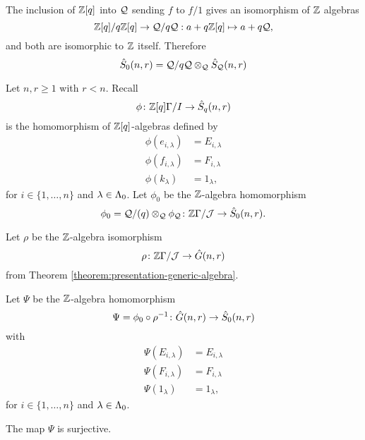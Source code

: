 \documentclass[a4paper, 11pt]{report}
\begin{document}
The inclusion of $\mathbb{Z}[q]$ into $\mathcal{Q}$ sending $f$ to $f/1$ gives an isomorphism of $\mathbb{Z}$ algebras
\begin{equation*}
\mathbb{Z}[q]/{q\mathbb{Z}[q]}\to\mathcal{Q}/{q\mathcal{Q}}: a + q\mathbb{Z}[q] \mapsto a + q\mathcal{Q},
\end{equation*}
and both are isomorphic to $\mathbb{Z}$ itself. Therefore
\begin{equation*}
\hat{S}_0(n,r) = \mathcal{Q}/{q\mathcal{Q}}\otimes_{\mathcal{Q}} \hat{S}_{\mathcal{Q}}(n,r)
\end{equation*}

Let $n,r\geq 1$ with $r<n$. Recall
\begin{equation*}
\phi\colon\mathbb{Z}[q]\Gamma/I \to\hat{S}_q(n,r)
\end{equation*}
is the homomorphism of $\mathbb{Z}[q]$-algebras defined by
\begin{align*}
\phi(e_{i,\lambda})&= E_{i,\lambda}\\
\phi(f_{i,\lambda})&= F_{i,\lambda}\\
\phi(k_\lambda)&= 1_\lambda,
\end{align*}
for $i\in\{1,\ldots,n\}$ and $\lambda\in\Lambda_0{}$. Let $\phi_0$ be the $\mathbb{Z}$-algebra homomorphism
\begin{equation*}
\phi_0 = \mathcal{Q}/{(q)}\otimes_{\mathcal{Q}} \phi_{\mathcal{Q}} \colon \mathbb{Z}\Gamma/{\mathcal{J}}\to\hat{S}_0(n,r).
\end{equation*}

Let $\rho$ be the $\mathbb{Z}$-algebra isomorphism
\begin{equation*}
\rho\colon \mathbb{Z}\Gamma/{\mathcal{J}}\to\hat{G}(n,r)
\end{equation*}
from Theorem \ref{theorem:presentation-generic-algebra}.

Let $\Psi$ be the $\mathbb{Z}$-algebra homomorphism
\begin{equation}\label{equation:transfer-map}
\Psi=\phi_0\circ \rho^{-1}\colon\hat{G}(n,r)\to\hat{S}_0(n,r)
\end{equation}
with
\begin{align*}
\Psi(E_{i,\lambda})&= E_{i,\lambda}\\
\Psi(F_{i,\lambda})&= F_{i,\lambda}\\
\Psi(1_\lambda)&= 1_\lambda,
\end{align*}
for $i\in\{1,\ldots,n\}$ and $\lambda\in\Lambda_0{}$.

\begin{proposition}\label{proposition:transfer-map-surjective}
The map $\Psi$ is surjective.
\end{proposition}
\end{document}
